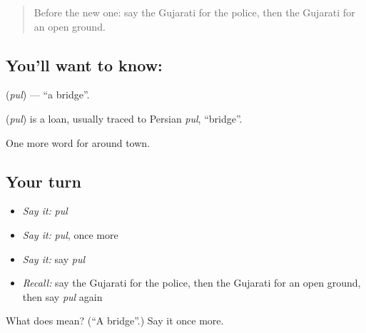 \label{lesson:GU-C84-bridge}



\begin{quote}
Before the new one: say the Gujarati for the police, then the Gujarati for an open ground.
\end{quote}

\subsection*{You'll want to know: }
\textbf{} (\emph{pul}) — \textquotedblleft{}a bridge\textquotedblright{}.

\begin{cousinweb}
\textbf{} (\emph{pul}) is a loan, usually traced to Persian \emph{pul}, \textquotedblleft{}bridge\textquotedblright{}.
\end{cousinweb}

\begin{grammarlens}[title={What you've built}]
One more word for around town.
\end{grammarlens}

\subsection*{Your turn}
\begin{itemize}
\raggedright
  \item \emph{Say it:} \emph{pul}
  \item \emph{Say it:} \emph{pul}, once more
  \item \emph{Say it:} say \emph{pul}
  \item \emph{Recall:} say the Gujarati for the police, then the Gujarati for an open ground, then say \emph{pul} again
\end{itemize}

\begin{tcolorbox}[breakable,colback=teal!4,colframe=teal!35!black,title={Before you move on}]
What does  mean? (\textquotedblleft{}A bridge\textquotedblright{}.) Say it once more.
\end{tcolorbox}
